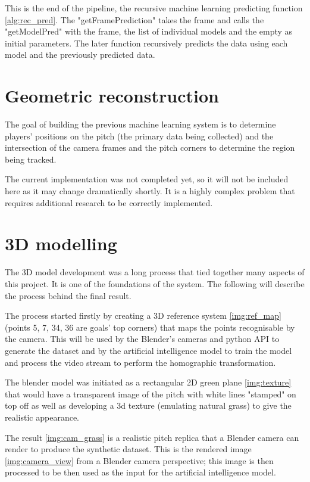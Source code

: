 \documentclass[
    11pt,
    oneside
]{report}
\begin{document}
This is the end of the pipeline, the recursive machine learning predicting function \ref{alg:rec_pred}. The "getFramePrediction" takes the frame and calls the "getModelPred" with the frame, the list of individual models and the empty as initial parameters. The later function recursively predicts the data using each model and the previously predicted data.


\section{Geometric reconstruction}

The goal of building the previous machine learning system is to determine players' positions on the pitch (the primary data being collected) and the intersection of the camera frames and the pitch corners to determine the region being tracked.


The current implementation was not completed yet, so it will not be included here as it may change dramatically shortly. It is a highly complex problem that requires additional research to be correctly implemented.




\section{3D modelling}


The 3D model development was a long process that tied together many aspects of this project. It is one of the foundations of the system. The following will describe the process behind the final result.


The process started firstly by creating a 3D reference system \ref{img:ref_map} (points 5, 7, 34, 36 are goals' top corners) that maps the points recognisable by the camera. This will be used by the Blender's cameras and python API to generate the dataset and by the artificial intelligence model to train the model and process the video stream to perform the homographic transformation.



The blender model was initiated as a rectangular 2D green plane \ref{img:texture} that would have a transparent image of the pitch with white lines "stamped" on top off as well as developing a 3d texture (emulating natural grass) to give the realistic appearance.



The result \ref{img:cam_grass} is a realistic pitch replica that a Blender camera can render to produce the synthetic dataset. This is the rendered image \ref{img:camera_view} from a Blender camera perspective; this image is then processed to be then used as the input for the artificial intelligence model.
\end{document}
